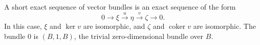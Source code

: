 A short exact sequence of vector bundles is an exact sequence of the form
$$0 \rightarrow \xi \xrightarrow{u} \eta \xrightarrow{v} \zeta \rightarrow 0.$$
In this case, $\xi$ and $\ker v$ are isomorphic, and $\zeta$ and $\operatorname{coker} v$ are isomorphic. The bundle $0$ is $(B, 1, B)$, the trivial zero-dimensional bundle over $B$.
